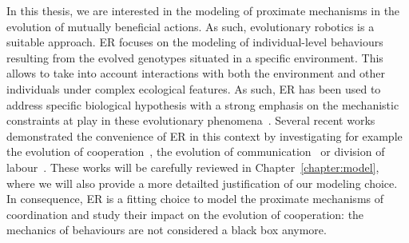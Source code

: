 

    In this thesis, we are interested in the modeling of proximate mechanisms in the evolution of mutually beneficial actions. As such, evolutionary robotics is a suitable approach. ER focuses on the modeling of individual-level behaviours resulting from the evolved genotypes situated in a specific environment. This allows to take into account interactions with both the environment and other individuals under complex ecological features. As such, ER has been used to address specific biological hypothesis with a strong emphasis on the mechanistic constraints at play in these evolutionary phenomena~\parencite{Floreano2010, Mitri2013}. Several recent works demonstrated the convenience of ER in this context by investigating for example the evolution of cooperation~\parencite{Waibel2011, Waibel2009}, the evolution of communication~\parencite{Mitri2011, Wischmann2012} or division of labour~\parencite{Ferrante2015}. These works will be carefully reviewed in Chapter~\ref{chapter:model}, where we will also provide a more detailted justification of our modeling choice. In consequence, ER is a fitting choice to model the proximate mechanisms of coordination and study their impact on the evolution of cooperation: the mechanics of behaviours are not considered a black box anymore.

